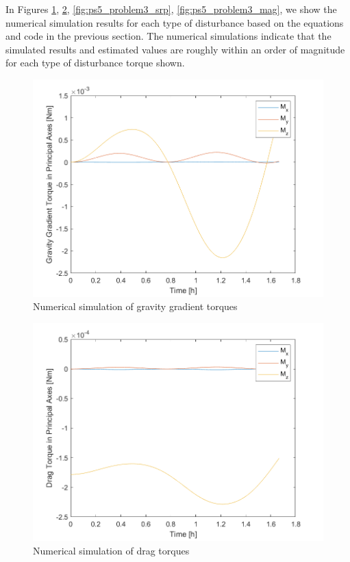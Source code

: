 In Figures \ref{fig:ps5_problem3_grav}, \ref{fig:ps5_problem3_drag}, \ref{fig:ps5_problem3_srp}, \ref{fig:ps5_problem3_mag}, we show the numerical simulation results for each type of disturbance based on the equations and code in the previous section. The numerical simulations indicate that the simulated results and estimated values are roughly within an order of magnitude for each type of disturbance torque shown.

\begin{figure}[H]
\centering
\includegraphics[scale=0.6]{Images/ps5_problem3_grav.png}
\caption{Numerical simulation of gravity gradient torques}
\label{fig:ps5_problem3_grav}
\end{figure}

\begin{figure}[H]
\centering
\includegraphics[scale=0.6]{Images/ps5_problem3_drag.png}
\caption{Numerical simulation of drag torques}
\label{fig:ps5_problem3_drag}
\end{figure}

